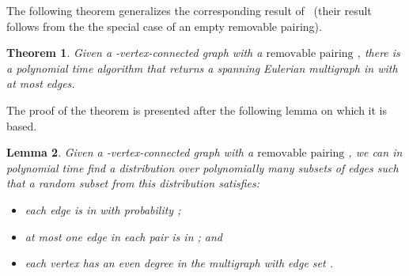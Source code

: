 \documentclass[letterpaper,11pt]{article}
\newtheorem{theorem}{Theorem}[section]
\newtheorem{lemma}[theorem]{Lemma}
\newcommand{\MS}{\ensuremath{\mbox{removable pairing}}\xspace}
\begin{document}
The following theorem generalizes the corresponding result of~\cite{MMP90} (their
result follows from the the special case of an empty removable pairing).
\begin{theorem}
\label{thm:main}
Given a -vertex-connected graph  with a \MS{} ,
there is a polynomial time algorithm that returns a
 spanning Eulerian
multigraph in  with at most
   edges.
\end{theorem}
The proof of the  theorem is presented after the following lemma on which it is based.
\begin{lemma}
\label{lemma:sample}
Given a -vertex-connected graph  with a \MS{} , we
can in polynomial time find a distribution over polynomially many
subsets of edges such that a random subset  from this distribution
satisfies:
\vspace{-0.2cm}
\begin{itemize}\itemsep-1mm
\item[(a)] each edge is in  with probability ;
\item[(b)] at most one edge in each pair is in ; and
\item[(c)] each vertex has an even degree in the multigraph with edge set .
\end{itemize}
\end{lemma}
\end{document}

